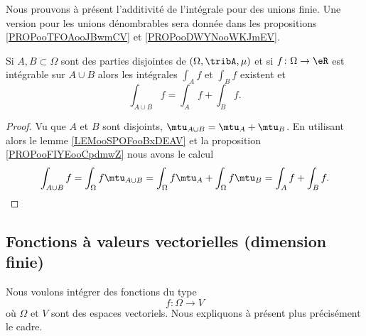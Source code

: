 Nous prouvons à présent l'additivité de l'intégrale pour des unions finie. Une version pour les unions dénombrables sera donnée dans les propositions \ref{PROPooTFOAooJBwmCV} et \ref{PROPooDWYNooWKJmEV}.
\begin{proposition}     \label{PropOPSCooVpzaBt}
	Si \( A,B\subset \Omega\) sont des parties disjointes de \( (\Omega,\tribA,\mu)\) et si \( f\colon \Omega\to \eR\) est intégrable sur \( A\cup B\) alors les intégrales \( \int_Af\) et \( \int_Bf\) existent et
	\begin{equation}
		\int_{A\cup B}f=\int_Af+\int_Bf.
	\end{equation}
\end{proposition}

\begin{proof}
	Vu que \( A\) et \( B\) sont disjoints, \( \mtu_{A\cup B}=\mtu_A+\mtu_B\). En utilisant alors le lemme \ref{LEMooSPOFooBxDEAV} et la proposition \ref{PROPooFIYEooCpdmwZ} nous avons le calcul
	\begin{equation}
		\int_{A\cup B}f=\int_{\Omega}f\mtu_{A\cup B}=\int_{\Omega} f\mtu_A+\int_{\Omega}f\mtu_B=\int_Af+\int_Bf.
	\end{equation}
\end{proof}


\subsection{Fonctions à valeurs vectorielles (dimension finie)}

Nous voulons intégrer des fonctions du type
\begin{equation}
	f \colon \Omega\to V
\end{equation}
où \( \Omega\) et \( V\) sont des espaces vectoriels. Nous expliquons à présent plus précisément le cadre.

